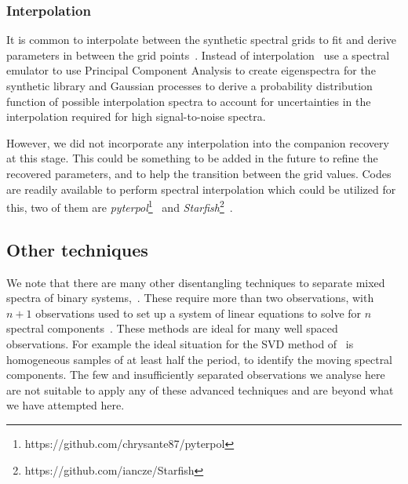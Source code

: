 \subsubsection{Interpolation}
\label{subsubsec:interpolation}
It is common to interpolate between the synthetic spectral grids to fit and derive parameters in between the grid points~\citep[e.g.][]{nemravova_xtauri_2016, passegger_fundamental_2016}.
Instead of interpolation~\cite{czekala_constructing_2015} use a spectral emulator to use Principal Component Analysis to create eigenspectra for the synthetic library and Gaussian processes to derive a probability distribution function of possible interpolation spectra to account for uncertainties in the interpolation required for high signal-to-noise spectra.

However, we did not incorporate any interpolation into the companion recovery at this stage.
This could be something to be added in the future to refine the recovered parameters, and to help the transition between the grid \logg{} values.
Codes are readily available to perform spectral interpolation which could be utilized for this, two of them are \emph{pyterpol}\footnote{https://github.com/chrysante87/pyterpol}~\citet{nemravova_xtauri_2016} and \emph{Starfish}\footnote{https://github.com/iancze/Starfish}~\cite{czekala_constructing_2015}.


\subsection{Other techniques}
We note that there are many other disentangling techniques to separate mixed spectra of binary systems,~\citep[e.g.][]{hadrava_disentangling_2009}.
These require more than two observations, with  \(n+1\) observations used to set up a system of linear equations to solve for \(n\) spectral components~\citep[e.g.][]{simon_disentangling_1994,czekala_disentangling_2017, sablowski_spectral_2016}.
These methods are ideal for many well spaced observations.
For example the ideal situation for the {SVD} method of~\citet{sablowski_spectral_2016} is homogeneous samples of at least half the period, to identify the moving spectral components.
The few and insufficiently separated observations we analyse here are not suitable to apply any of these advanced techniques and are beyond what we have attempted here.











